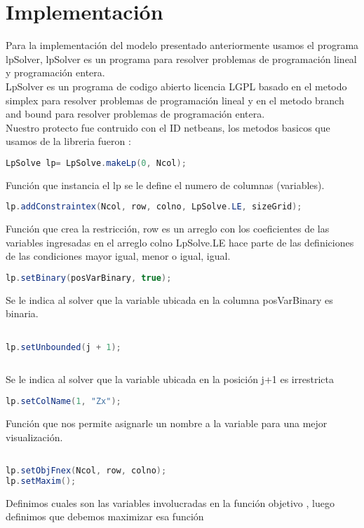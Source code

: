 \documentclass[10pt]{article}
\begin{document}
\section{Implementaci\'on}

Para la implementaci\'on del modelo presentado anteriormente usamos el programa lpSolver, lpSolver es un programa para resolver problemas de programación lineal y programación entera.\\

LpSolver es un programa de codigo abierto licencia LGPL basado en el metodo simplex para resolver problemas de programación lineal y en el metodo branch and bound para  resolver problemas de programaci\'on entera.\\

Nuestro protecto fue contruido con el ID netbeans,  los metodos basicos que usamos de la libreria  fueron : 


\begin{lstlisting}[language=Java]
LpSolve lp= LpSolve.makeLp(0, Ncol);
\end{lstlisting}

Funci\'on que instancia el lp se le define el numero de columnas (variables). 


\begin{lstlisting}[language=Java]
lp.addConstraintex(Ncol, row, colno, LpSolve.LE, sizeGrid);
\end{lstlisting}
Funci\'on que crea la restricci\'on, row es un arreglo con los coeficientes de las variables ingresadas en el arreglo colno   LpSolve.LE hace parte de las definiciones de las condiciones mayor igual, menor o igual, igual.

\begin{lstlisting}[language=Java]
lp.setBinary(posVarBinary, true);
\end{lstlisting}
Se le indica al solver que la variable ubicada en la columna posVarBinary es binaria.

\begin{lstlisting}[language=Java]

lp.setUnbounded(j + 1);
  
\end{lstlisting}

Se le indica al solver que la variable ubicada en la posici\'on j+1 es irrestricta

\begin{lstlisting}[language=Java]
lp.setColName(1, "Zx");
\end{lstlisting}
Funci\'on que nos permite asignarle un nombre a la variable para una mejor visualizaci\'on.


\begin{lstlisting}[language=Java]

lp.setObjFnex(Ncol, row, colno);
lp.setMaxim();	

\end{lstlisting}
Definimos cuales son las variables involucradas en la funci\'on objetivo , luego  definimos que debemos maximizar esa funci\'on
\end{document}
